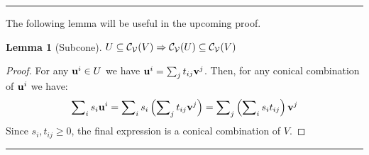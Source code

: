 \documentclass[a4,fleqn]{article}
\newtheorem{lemma}{Lemma}
\begin{document}
\bigskip \hrule \bigskip

The following lemma will be useful in the upcoming proof.
\begin{lemma}[Subcone]{\label{lemma:subcone}
  $U \subseteq \mathcal{C}_{\mathcal{V}}(V) \Rightarrow \mathcal{C}_{\mathcal{V}}(U) \subseteq \mathcal{C}_{\mathcal{V}}(V)$
} \end{lemma}
\begin{proof}
For any $\mathbf{u}^i \in U$ we have $\mathbf{u}^i = \sum_j t_{ij} \mathbf{v}^j$.  Then, for any conical combination of $\mathbf{u}^i$ we have:
\[ \sum\nolimits_i s_i\mathbf{u}^i 
        = \sum\nolimits_i s_i\left(\sum\nolimits_j t_{ij} \mathbf{v}^j\right)
        = \sum\nolimits_j \left(\sum\nolimits_i s_i t_{ij}\right) \mathbf{v}^j
\]
Since $s_i, t_{ij} \geq 0$, the final expression is a conical combination of $V$.
\end{proof}

\bigskip \hrule \bigskip
\end{document}
